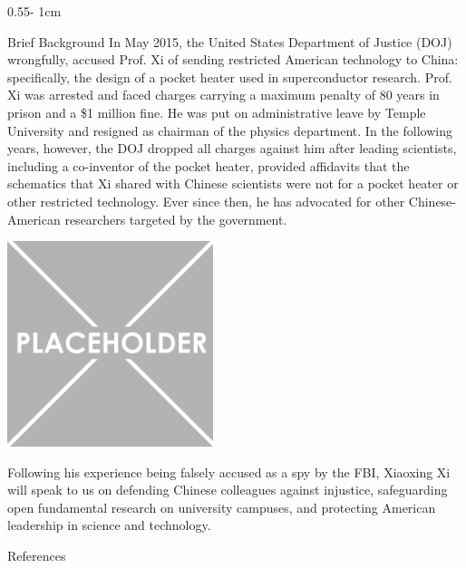 \documentclass{../psuposter}
\begin{document}
\begin{frame}
\begin{columns}[t, totalwidth=\textwidth]
\begin{column}{0.55\textwidth - 1cm}
    \begin{block}{Brief Background}
    In May 2015, the United States Department of Justice (DOJ) wrongfully, accused Prof. Xi of sending restricted American technology to China: specifically, the design of a pocket heater used in superconductor research. Prof. Xi was arrested and faced charges carrying a maximum penalty of 80 years in prison and a \$1 million fine. He was put on administrative leave by Temple University and resigned as chairman of the physics department. In the following years, however, the DOJ dropped all charges against him after leading scientists, including a co-inventor of the pocket heater, provided affidavits that the schematics that Xi shared with Chinese scientists were not for a pocket heater or other restricted technology. Ever since then, he has advocated for other Chinese-American researchers targeted by the government.
    	
        \begin{center}
		   	\includegraphics[width=0.45\textwidth]{images/background}    		
    	\end{center}
		Following his experience being falsely accused as a spy by the FBI, Xiaoxing Xi will speak to us on defending Chinese colleagues against injustice, safeguarding open fundamental research on university campuses, and protecting American leadership in science and technology.  
    \end{block}


    \begin{block}{References}
        
%        
		
    \end{block}


\end{column}
\end{columns}
\end{frame}
\end{document}
